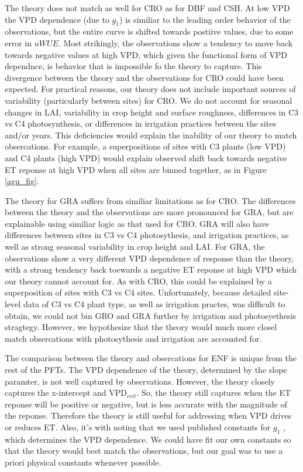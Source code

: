 \documentclass[draft,linenumbers]{agujournal}
\begin{document}
The theory does not match as well for CRO as for DBF and CSH. At low VPD the VPD dependence (due to $g_1$) is similiar to the leading order behavior of the observations, but the entire curve is shifted towards postiive values, due to some error in $uWUE$. Most strikingly, the observations show a tendency to move back towards negative values at high VPD, which given the functional form of VPD dependnce, is behavior that is impossible fo the theory to capture. This divergence between the theory and the observations for CRO could have been expected. For practical reasons, our theory does not include important sources of variability (particularly between sites) for CRO. We do not account for seasonal changes in LAI, variability in crop height and surface roughness, differences in C3 vs C4 photosynthesis, or differences in irrigation practices between the sites and/or years. This deficiencies would explain the inability of our theory to match obsercations. For example, a superpositions of sites with C3 plants (low VPD) and C4 plants (high VPD) would explain observed shift back towards negative ET reponse at high VPD when all sites are binned together, as in Figure \ref{agu_fig}.   

The theory for GRA suffers from similiar limitations as for CRO. The differences between the theory and the observations are more pronounced for GRA, but are explainable using similiar logic as that used for CRO. GRA will also have differences between sites in C3 vs C4 photosythesis, and irrigation practices, as well as strong seasonal variability in crop height and LAI. For GRA, the observations show a very different VPD dependence of response than the theory, with a strong tendency back toewards a negative ET reponse at high VPD which our theory cannot account for. As with CRO, this could be explained by a superposition of sites with C3 vs C4 sites. Unfortunately, because detailed site-level data of C3 vs C4 plant type, as well as irrigation practes, was difficult to obtain, we could not bin GRO and GRA further by irrigation and photosyethesis stragtegy. However, we hypothesize that the theory would much more closel match obsercations with photosythesis and irrigation are accounted for. 

The comparison between the theory and obsercations for ENF is unique from the rest of the PFTs. The VPD dependence of the theory, determined by the slope paramter, is not well captured by observations. However, the theory closely captures the x-intercept and VPD$_{crit}$. So, the theory still captures when the ET reponse will be positive or negative, but is less accurate with the magnitude of the reponse. Therefore the theory is still useful for addressing when VPD drives or reduces ET. Also, it's with noting that we used published constants for $g_1$ \citep[from ][]{Lin_2015}, which determines the VPD dependence. We could have fit our own constants so that the theory would best match the observations, but our goal was to use a priori physical constants whenever possible.
\end{document}
